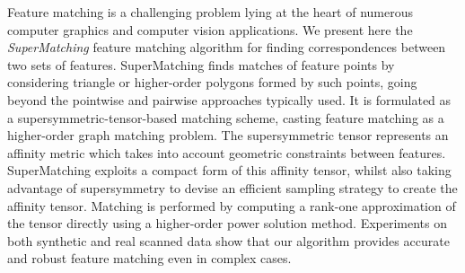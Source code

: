 Feature matching is a challenging problem lying at the heart of numerous computer graphics and computer vision applications.
We present here the \emph{SuperMatching} feature matching algorithm for finding correspondences between two sets of features.
SuperMatching finds matches of feature points by considering triangle or higher-order polygons formed by such points, going beyond the pointwise and pairwise approaches typically used.
It is formulated as a supersymmetric-tensor-based matching scheme,
casting feature matching as a higher-order graph matching problem.
The supersymmetric tensor represents an affinity metric which takes into account geometric constraints between features.
SuperMatching exploits a compact form of this affinity tensor,
whilst also taking advantage of supersymmetry to devise an
efficient sampling strategy to create the affinity tensor.
Matching is performed by computing a rank-one approximation of the tensor directly
using a higher-order power solution method.
Experiments on both synthetic and real scanned data show that
our algorithm provides accurate and robust feature matching even in complex cases.
